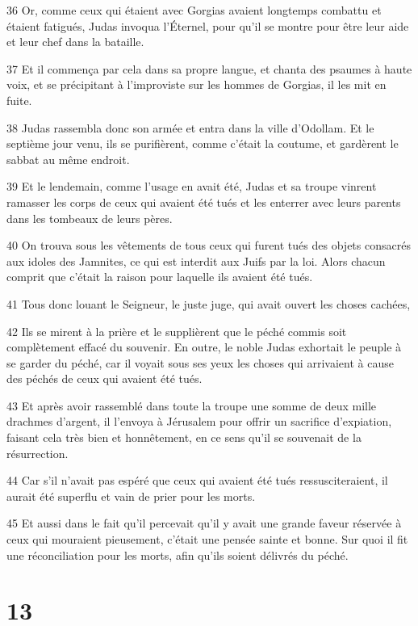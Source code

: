 \par 36 Or, comme ceux qui étaient avec Gorgias avaient longtemps combattu et étaient fatigués, Judas invoqua l'Éternel, pour qu'il se montre pour être leur aide et leur chef dans la bataille.
\par 37 Et il commença par cela dans sa propre langue, et chanta des psaumes à haute voix, et se précipitant à l'improviste sur les hommes de Gorgias, il les mit en fuite.
\par 38 Judas rassembla donc son armée et entra dans la ville d'Odollam. Et le septième jour venu, ils se purifièrent, comme c'était la coutume, et gardèrent le sabbat au même endroit.
\par 39 Et le lendemain, comme l'usage en avait été, Judas et sa troupe vinrent ramasser les corps de ceux qui avaient été tués et les enterrer avec leurs parents dans les tombeaux de leurs pères.
\par 40 On trouva sous les vêtements de tous ceux qui furent tués des objets consacrés aux idoles des Jamnites, ce qui est interdit aux Juifs par la loi. Alors chacun comprit que c'était la raison pour laquelle ils avaient été tués.
\par 41 Tous donc louant le Seigneur, le juste juge, qui avait ouvert les choses cachées,
\par 42 Ils se mirent à la prière et le supplièrent que le péché commis soit complètement effacé du souvenir. En outre, le noble Judas exhortait le peuple à se garder du péché, car il voyait sous ses yeux les choses qui arrivaient à cause des péchés de ceux qui avaient été tués.
\par 43 Et après avoir rassemblé dans toute la troupe une somme de deux mille drachmes d'argent, il l'envoya à Jérusalem pour offrir un sacrifice d'expiation, faisant cela très bien et honnêtement, en ce sens qu'il se souvenait de la résurrection.
\par 44 Car s'il n'avait pas espéré que ceux qui avaient été tués ressusciteraient, il aurait été superflu et vain de prier pour les morts.
\par 45 Et aussi dans le fait qu'il percevait qu'il y avait une grande faveur réservée à ceux qui mouraient pieusement, c'était une pensée sainte et bonne. Sur quoi il fit une réconciliation pour les morts, afin qu'ils soient délivrés du péché.

\chapter{13}

